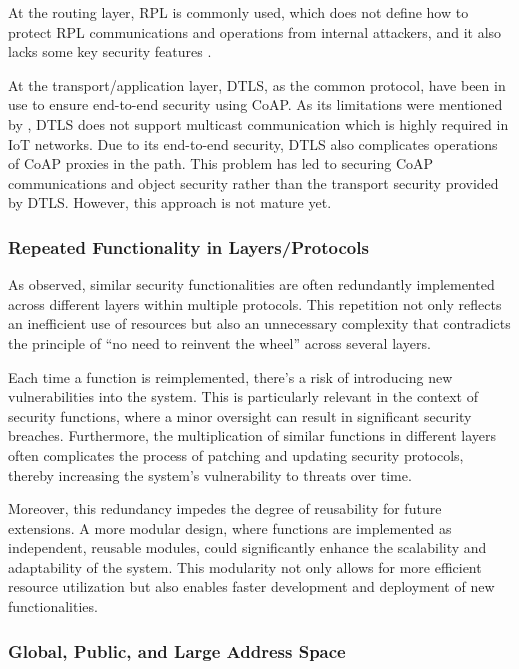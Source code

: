 \documentclass{ieeeaccess}
\begin{document}
At the routing layer, RPL \cite{rfc6550} is commonly used, which does not define how to protect RPL communications and operations from internal attackers, and it also lacks some key security features \cite{7005393}. 

At the transport/application layer, DTLS, as the common protocol, have been in use to ensure end-to-end security using CoAP. As its limitations were mentioned by \cite{7005393}, DTLS does not support multicast communication which is highly required in IoT networks. Due to its end-to-end security, DTLS also complicates operations of CoAP proxies in the path. This problem has led to securing CoAP communications and object security rather than the transport security provided by DTLS. However, this approach is not mature yet.

\subsubsection{Repeated Functionality in Layers/Protocols}

As observed, similar security functionalities are often redundantly implemented across different layers within multiple protocols. This repetition not only reflects an inefficient use of resources but also an unnecessary complexity that contradicts the principle of ``no need to reinvent the wheel'' across several layers.

Each time a function is reimplemented, there's a risk of introducing new vulnerabilities into the system. This is particularly relevant in the context of security functions, where a minor oversight can result in significant security breaches. Furthermore, the multiplication of similar functions in different layers often complicates the process of patching and updating security protocols, thereby increasing the system's vulnerability to threats over time.

Moreover, this redundancy impedes the degree of reusability for future extensions. A more modular design, where functions are implemented as independent, reusable modules, could significantly enhance the scalability and adaptability of the system. This modularity not only allows for more efficient resource utilization but also enables faster development and deployment of new functionalities.

\subsubsection{Global, Public, and Large Address Space}
\end{document}
